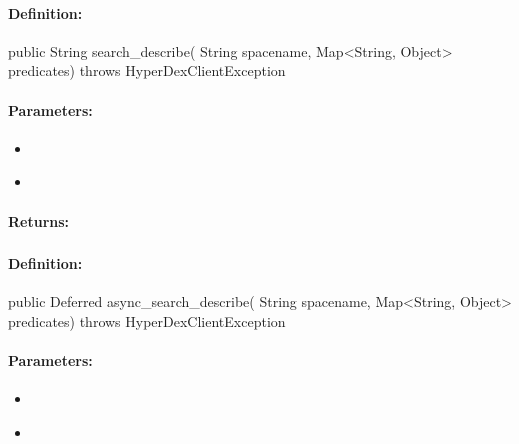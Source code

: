 \paragraph{Definition:}
\begin{javacode}
public String search_describe(
        String spacename,
        Map<String, Object> predicates) throws HyperDexClientException
\end{javacode}

\paragraph{Parameters:}
\begin{itemize}[noitemsep]
\item {}\\

\item {}\\

\end{itemize}

\paragraph{Returns:}


\pagebreak
\subsubsection{}
\label{api:java:async_search_describe}


\paragraph{Definition:}
\begin{javacode}
public Deferred async_search_describe(
        String spacename,
        Map<String, Object> predicates) throws HyperDexClientException
\end{javacode}

\paragraph{Parameters:}
\begin{itemize}[noitemsep]
\item {}\\

\item {}\\

\end{itemize}

